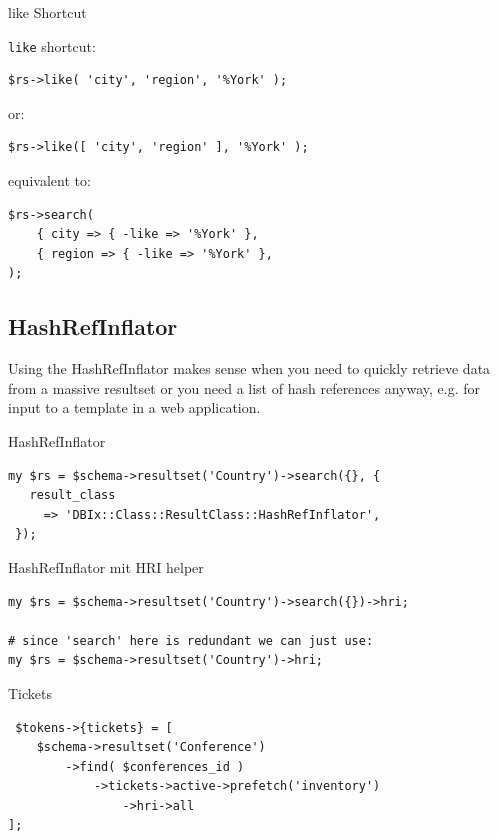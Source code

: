 \begin{frame}[fragile]{like Shortcut}

\verb|like| shortcut:

\begin{lstlisting}
$rs->like( 'city', 'region', '%York' );
\end{lstlisting}

or:

\begin{lstlisting}
$rs->like([ 'city', 'region' ], '%York' );
\end{lstlisting}

equivalent to:

\begin{lstlisting}
$rs->search(
    { city => { -like => '%York' },
    { region => { -like => '%York' },
);
\end{lstlisting}
\end{frame}

\subsection{HashRefInflator}

Using the HashRefInflator makes sense when you need to quickly retrieve
data from a massive resultset or you need a list of hash references anyway,
e.g. for input to a template in a web application.

\begin{frame}[fragile]{HashRefInflator}
\begin{lstlisting}
my $rs = $schema->resultset('Country')->search({}, {
   result_class
     => 'DBIx::Class::ResultClass::HashRefInflator',
 });
\end{lstlisting}
\end{frame}

\begin{frame}[fragile]{HashRefInflator mit HRI helper}
\begin{lstlisting}
my $rs = $schema->resultset('Country')->search({})->hri;

# since 'search' here is redundant we can just use:
my $rs = $schema->resultset('Country')->hri;
\end{lstlisting}
\end{frame}

\begin{frame}[fragile]{Tickets}
\begin{lstlisting}
 $tokens->{tickets} = [
    $schema->resultset('Conference')
        ->find( $conferences_id )
            ->tickets->active->prefetch('inventory')
                ->hri->all 
];
\end{lstlisting}
\end{frame}

